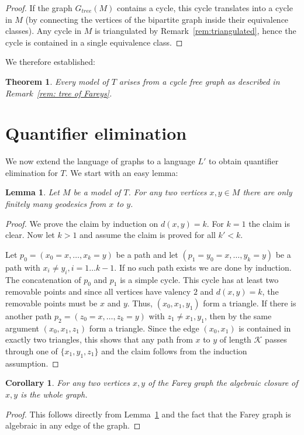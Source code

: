 \documentclass[10pt,a4paper]{amsart}
\newcommand{\K}{\mathcal{K}}
\newtheorem{theorem}[defi]{Theorem}
\newtheorem{lemma}[defi]{Lemma}
\newtheorem{corollary}[defi]{Corollary}
\begin{document}
\begin{proof}
    If the graph $G_{tree}(M)$ contains a cycle, this cycle translates into a cycle in $M$ (by connecting the vertices  of
    the bipartite graph inside their equivalence classes). Any cycle in $M$ is
    triangulated by Remark~\ref{rem:triangulated}, hence the cycle is contained in a single equivalence class.    
\end{proof}

We therefore established:
\begin{theorem}\label{thm:classification}
Every model of $T$ arises from a cycle free graph as described in Remark~\ref{rem: tree of Fareys}.
\end{theorem}

\section{Quantifier elimination}\label{sec:QE}

We now extend the language of graphs to a language $L'$ to obtain quantifier elimination for $T$.
We start with an easy lemma: 
\begin{lemma}\label{lem:finitely_many_path}
Let $M$ be a model of $T$.
    For  any two vertices $x, y\in M$ 
  there are only finitely many geodesics from $x$ to $y$.
\end{lemma}

\begin{proof}
    We prove the claim by induction on $d(x,y)=k$. For $k=1$ the claim is clear. Now let $k>1$ and assume the claim is proved for all
$k'<k$.

  Let $p_0=(x_0=x,\ldots, x_k=y)$ be a path and let $(p_1=y_0=x,\ldots,
y_k=y)$ be a path with $x_i\neq y_i, i=1\ldots k-1$. If no such path
exists we are done by induction.  The concatenation of $p_0$ and $p_1$
is a simple cycle. This cycle has at least two removable points and since
all vertices have valency $2$ and $d(x,y)=k$, the removable points must be
$x$ and $y$. Thus, $(x_0,x_1,y_1)$ form a triangle.
If there is another path $p_2=(z_0=x,\ldots, z_k=y)$ with $z_1\neq
x_1,y_1$, then by the same argument $(x_0,x_1,z_1)$ form a triangle.
Since the edge $(x_0,x_1)$ is contained in exactly two triangles, this
shows that any path from $x$ to $y$ of length $\K$ passes through one of
$\{x_1, y_1,z_1\}$ and the claim follows from the induction assumption.
\end{proof}

\begin{corollary}
        For any two vertices $x,y$ of the Farey graph the algebraic
        closure  of $x,y$ is the whole graph.
\end{corollary}
 \begin{proof}
     This follows directly from Lemma~\ref{lem:finitely_many_path} and the fact that the Farey graph is algebraic in any edge of the graph.
 \end{proof}
 
\end{document}
